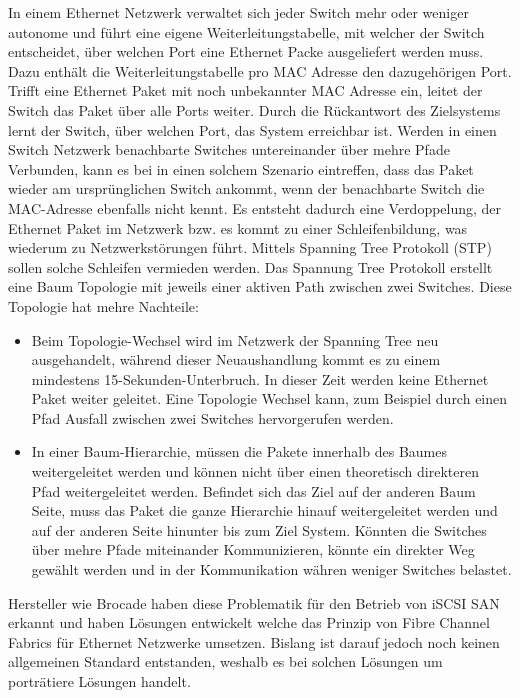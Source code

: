 In einem Ethernet Netzwerk verwaltet sich jeder Switch mehr oder weniger autonome und führt eine eigene Weiterleitungstabelle, mit welcher der Switch entscheidet, über welchen Port eine Ethernet Packe ausgeliefert werden muss. Dazu enthält die Weiterleitungstabelle pro MAC Adresse den dazugehörigen Port. Trifft eine Ethernet Paket mit noch unbekannter MAC Adresse ein, leitet der Switch das Paket über alle Ports weiter. Durch die Rückantwort des Zielsystems lernt der Switch, über welchen Port, das System erreichbar ist. Werden in einen Switch Netzwerk benachbarte Switches untereinander über mehre Pfade Verbunden, kann es bei in einen solchem Szenario eintreffen, dass das Paket wieder am ursprünglichen Switch ankommt, wenn der benachbarte Switch die MAC-Adresse ebenfalls nicht kennt. Es entsteht dadurch eine Verdoppelung, der Ethernet Paket im Netzwerk bzw. es kommt zu einer Schleifenbildung, was wiederum zu Netzwerkstörungen führt. Mittels Spanning Tree Protokoll (STP) sollen solche Schleifen vermieden werden. Das Spannung Tree Protokoll erstellt eine Baum Topologie mit jeweils einer aktiven Path zwischen zwei Switches. Diese Topologie hat mehre Nachteile: 

\begin{itemize}
\item Beim Topologie-Wechsel wird im Netzwerk der Spanning Tree neu ausgehandelt, während dieser Neuaushandlung kommt es zu einem mindestens 15-Sekunden-Unterbruch. In dieser Zeit werden keine Ethernet Paket weiter geleitet. Eine Topologie Wechsel kann, zum Beispiel durch einen Pfad Ausfall zwischen zwei Switches hervorgerufen werden.

\item In einer Baum-Hierarchie, müssen die Pakete innerhalb des Baumes weitergeleitet werden und können nicht über einen theoretisch direkteren Pfad weitergeleitet werden. Befindet sich das Ziel auf der anderen Baum Seite, muss das Paket die ganze Hierarchie hinauf weitergeleitet werden und auf der anderen Seite hinunter bis zum Ziel System. Könnten die Switches über mehre Pfade miteinander Kommunizieren, könnte ein direkter Weg gewählt werden und in der Kommunikation währen weniger Switches belastet.
\end{itemize}

Hersteller wie Brocade haben diese Problematik für den Betrieb von iSCSI SAN erkannt und haben Lösungen entwickelt welche das Prinzip von Fibre Channel Fabrics für Ethernet Netzwerke umsetzen. Bislang ist darauf jedoch noch keinen allgemeinen Standard entstanden, weshalb es bei solchen Lösungen um porträtiere Lösungen handelt.

